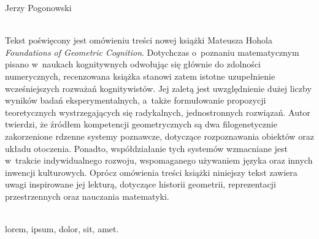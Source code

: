 \begin{newrevplenv}{Jerzy Pogonowski}




\vspace{5mm}%
\begin{flushright}
{\chaptitleeng\color{black!50}{Geometric cognition\\from a~cognitive point of view}}
\end{flushright}

{}\\
{Tekst poświęcony jest omówieniu treści nowej książki Mateusza
Hohola {\em Foundations of Geometric Cognition}. Dotychczas o~poznaniu matematycznym pisano w~naukach kognitywnych odwołując się
głównie do zdolności numerycznych, recenzowana książka stanowi
zatem istotne uzupełnienie wcześniejszych rozważań kognitywistów.
Jej zaletą jest uwzględnienie dużej liczby wyników badań
eksperymentalnych, a~także formułowanie propozycji teoretycznych
wystrzegających się radykalnych, jednostronnych rozwiązań. Autor
twierdzi, że źródłem kompetencji geometrycznych są dwa
filogenetycznie zakorzenione rdzenne systemy poznawcze, dotyczące
rozpoznawania obiektów oraz układu otoczenia. Ponadto,
współdziałanie tych systemów wzmacniane jest w~trakcie
indywidualnego rozwoju, wspomaganego używaniem języka oraz innych
inwencji kulturowych. Oprócz omówienia treści książki niniejszy
tekst zawiera uwagi inspirowane jej lekturą, dotyczące historii
geometrii, reprezentacji przestrzennych oraz nauczania matematyki.}\par%
\vspace{2mm}%
{}\\%
{lorem, ipsum, dolor, sit, amet.}%





\end{newrevplenv}
